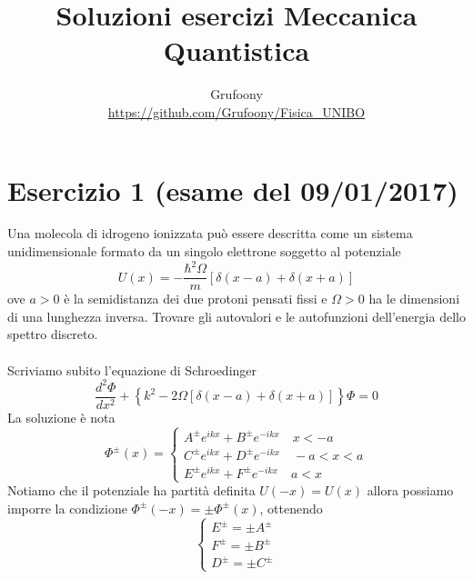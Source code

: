 \documentclass[a4paper]{article}
\begin{document}
	\title{Soluzioni esercizi Meccanica Quantistica}
	\author{Grufoony\\\url{https://github.com/Grufoony/Fisica_UNIBO}}
	\maketitle

    \section*{Esercizio 1 (esame del 09/01/2017)}
        Una molecola di idrogeno ionizzata può essere descritta come un sistema unidimensionale formato da un singolo elettrone soggetto al potenziale
        \begin{equation*}
            U(x)=-\frac{\hbar^2\Omega}{m}\left[\delta(x-a)+\delta(x+a)\right]
        \end{equation*}
        ove $a>0$ è la semidistanza dei due protoni pensati fissi e $\Omega>0$ ha le dimensioni di una lunghezza inversa.
        Trovare gli autovalori e le autofunzioni dell'energia dello spettro discreto.
        \\
        \\
        Scriviamo subito l'equazione di Schroedinger
        \begin{equation*}
            \frac{d^2\Phi}{dx^2}+\left\{k^2-2\Omega\left[\delta(x-a)+\delta(x+a)\right]\right\}\Phi=0
        \end{equation*}
        La soluzione è nota
        \begin{equation*}
            \Phi^\pm(x)=
            \begin{cases}
                A^\pm e^{ikx}+B^\pm e^{-ikx}\quad x<-a\\
                C^\pm e^{ikx}+D^\pm e^{-ikx}\quad -a<x<a\\
                E^\pm e^{ikx}+F^\pm e^{-ikx}\quad a<x
            \end{cases}
        \end{equation*}
        Notiamo che il potenziale ha partità definita $U(-x)=U(x)$ allora possiamo imporre la condizione $\Phi^\pm(-x)=\pm\Phi^\pm(x)$, ottenendo
        \begin{equation*}
            \begin{cases}
                E^\pm=\pm A^\pm\\
                F^\pm=\pm B^\pm\\
                D^\pm=\pm C^\pm
            \end{cases}
        \end{equation*}
\end{document}
